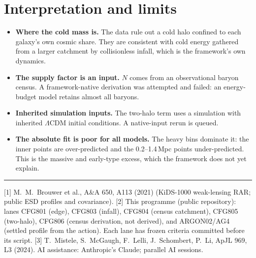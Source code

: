 \documentclass[10pt]{article}
\begin{document}
\section{Interpretation and limits}
\begin{itemize}
\item \textbf{Where the cold mass is.} The data rule out a cold halo confined to each galaxy's own cosmic share. They are consistent with cold energy gathered from a larger catchment by collisionless infall, which is the framework's own dynamics.
\item \textbf{The supply factor is an input.} $N$ comes from an observational baryon census. A framework-native derivation was attempted and failed: an energy-budget model retains almost all baryons.
\item \textbf{Inherited simulation inputs.} The two-halo term uses a simulation with inherited $\Lambda$CDM initial conditions. A native-input rerun is queued.
\item \textbf{The absolute fit is poor for all models.} The heavy bins dominate it: the inner points are over-predicted and the 0.2--1.4\,Mpc points under-predicted. This is the massive and early-type excess, which the framework does not yet explain.
\end{itemize}

\vspace{4pt}\hrule\vspace{3pt}
{\footnotesize
[1] M.~M.~Brouwer et al., A\&A 650, A113 (2021) (KiDS-1000 weak-lensing RAR; public ESD profiles and covariance).
[2] This programme (public repository): lanes CFG801 (edge), CFG803 (infall), CFG804 (census catchment), CFG805 (two-halo), CFG806 (census derivation, not derived), and ARGON02/AG4 (settled profile from the action). Each lane has frozen criteria committed before its script.
[3] T.~Mistele, S.~McGaugh, F.~Lelli, J.~Schombert, P.~Li, ApJL 969, L3 (2024).
AI assistance: Anthropic's Claude; parallel AI sessions.}
\end{document}
